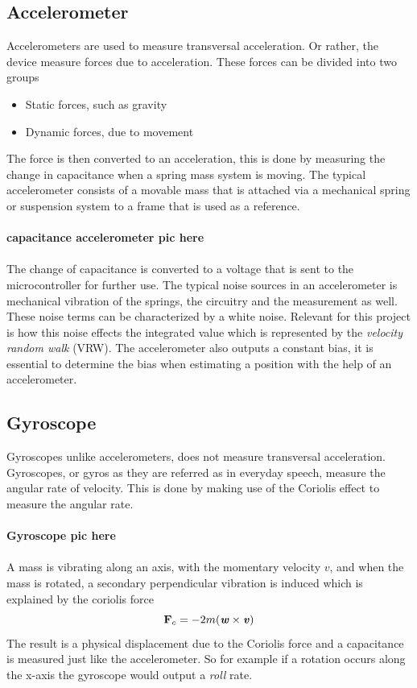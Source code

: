 \documentclass[a4paper,11pt]{kth-mag}
\begin{document}
\subsection{Accelerometer}
Accelerometers are used to measure transversal acceleration. Or rather, the device measure forces due to acceleration. These forces can be divided into two groups 
\begin{itemize}
\item Static forces, such as gravity
\item Dynamic forces, due to movement
\end{itemize}
The force is then converted to an acceleration, this is done by measuring the change in capacitance when a spring mass system is moving. The typical accelerometer consists of a movable mass that is attached via a mechanical spring or suspension system to a frame that is used as a reference. 
\\ \\
\textbf{capacitance accelerometer pic here}
\\ \\
The change of capacitance is converted to a voltage that is sent to the microcontroller for further use. The typical noise sources in an accelerometer is mechanical vibration of the springs, the circuitry and the measurement as well. These noise terms can be characterized by a white noise. Relevant for this project is how this noise effects the integrated value which is represented by the \textit{velocity random walk} (VRW). The accelerometer also outputs a constant bias, it is essential to determine the bias when estimating a position with the help of an accelerometer.
\cite{ref:accelerometero}

\subsection{Gyroscope} \label{gyroscope}
Gyroscopes unlike accelerometers, does not measure transversal acceleration. Gyroscopes, or gyros as they are referred as in everyday speech, measure the angular rate of velocity. This is done by making use of the Coriolis effect to measure the angular rate.
\\ \\
\textbf{Gyroscope pic here}
\\ \\
A mass is vibrating along an axis, with the momentary velocity $v$, and when the mass is rotated, a secondary perpendicular vibration is induced which is explained by the coriolis force
\begin{equation}\label{eq:coriolis}
\textbf{F}_c = -2m(\textbf{\textit{w}} \times \textbf{\textit{v}})
\end{equation}
The result is a physical displacement due to the Coriolis force and a capacitance is measured just like the accelerometer. So for example if a rotation occurs along the x-axis the gyroscope would output a \textit{roll} rate.
\end{document}
